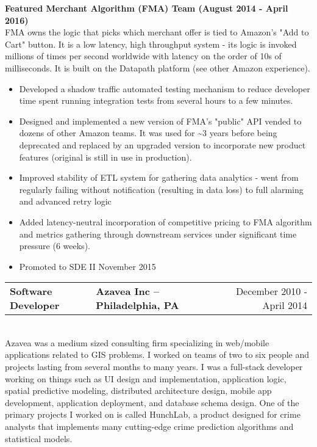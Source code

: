 \documentclass{res}
\newlength{\vsep}
\begin{document}
\begin{resume}
\begin{itemize}
   \end{itemize}
   \vspace{\vsep}
   {\large \bf Featured Merchant Algorithm (FMA) Team (August 2014 - April 2016)}\\
   FMA owns the logic that picks which merchant offer is tied to Amazon's "Add to Cart" button. It is a low latency, high throughput system - its logic is invoked millions of times per second worldwide with latency on the order of 10s of milliseconds.  It is built on the Datapath platform (see other Amazon experience).
   \begin{itemize}
   \item Developed a shadow traffic automated testing mechanism to reduce developer time spent running integration tests from several hours to a few minutes.
   \item Designed and implemented a new version of FMA's "public" API vended to dozens of other Amazon teams.  It was used for \textasciitilde 3 years before being deprecated and replaced by an upgraded version to incorporate new product features (original is still in use in production).
   \item Improved stability of ETL system for gathering data analytics - went from regularly failing without notification (resulting in data loss) to full alarming and advanced retry logic
   \item Added latency-neutral incorporation of competitive pricing to FMA algorithm and metrics gathering through downstream services under significant time pressure (6 weeks).
   \item Promoted to SDE II November 2015
   \end{itemize}
   \vspace{\vsep}
   
   \begin{tabularx}{\textwidth}{@{}>{\bf}l>{\large\bf\centering\arraybackslash}Xr@{}}
   Software Developer & Azavea Inc -- Philadelphia, PA & December 2010 - April 2014\vspace{\vsep}\\
   \end{tabularx}\\
   Azavea was a medium sized consulting firm specializing in web/mobile applications related to GIS problems.  I worked on teams of two to six people and projects lasting from several months to many years.  I was a full-stack developer working on things such as UI design and implementation, application logic, spatial predictive modeling, distributed architecture design, mobile app development, application deployment, and database schema design.  One of the primary projects I worked on is called HunchLab, a product designed for crime analysts that implements many cutting-edge crime prediction algorithms and statistical models.\\


\end{resume}
\end{document}
